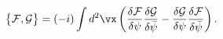 \begin{equation}
     \big\{{\cal F}, {\cal G}\big\}=(-i)
     \displaystyle\int d^{2}\vx\left(\frac
     {\delta{\cal F}}{\delta\psi}\frac{\delta{\cal G}}{\delta\bar{\psi}}
     -
     \frac{\delta{\cal G}}{\delta\psi}\frac{\delta{\cal F}}
     {\delta\bar{\psi}}\right).
\label{PBdef}
\end{equation}

